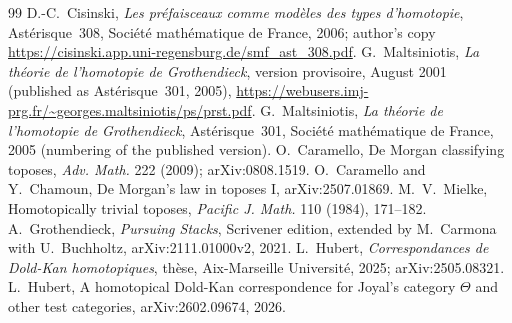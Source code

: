 \begin{thebibliography}{99}
 D.-C.~Cisinski, \emph{Les préfaisceaux comme modèles des types d'homotopie}, Astérisque~308, Société mathématique de France, 2006; author's copy \url{https://cisinski.app.uni-regensburg.de/smf_ast_308.pdf}.
 G.~Maltsiniotis, \emph{La théorie de l'homotopie de Grothendieck}, version provisoire, August 2001 (published as Astérisque~301, 2005), \url{https://webusers.imj-prg.fr/~georges.maltsiniotis/ps/prst.pdf}.
 G.~Maltsiniotis, \emph{La théorie de l'homotopie de Grothendieck}, Astérisque~301, Société mathématique de France, 2005 (numbering of the published version).
 O.~Caramello, De Morgan classifying toposes, \emph{Adv. Math.} 222 (2009); arXiv:0808.1519.
 O.~Caramello and Y.~Chamoun, De Morgan's law in toposes I, arXiv:2507.01869.
 M.~V.~Mielke, Homotopically trivial toposes, \emph{Pacific J. Math.} 110 (1984), 171--182.
 A.~Grothendieck, \emph{Pursuing Stacks}, Scrivener edition, extended by M.~Carmona with U.~Buchholtz, arXiv:2111.01000v2, 2021.
 L.~Hubert, \emph{Correspondances de Dold-Kan homotopiques}, thèse, Aix-Marseille Université, 2025; arXiv:2505.08321.
 L.~Hubert, A homotopical Dold-Kan correspondence for Joyal's category $\Theta$ and other test categories, arXiv:2602.09674, 2026.
\end{thebibliography}
